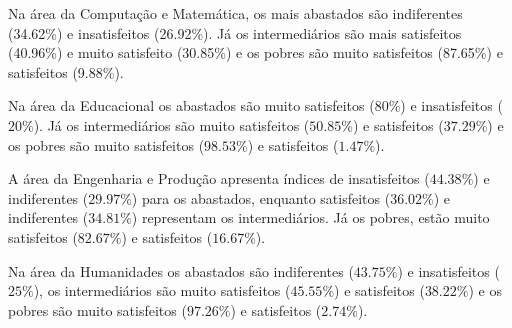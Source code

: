 \documentclass[10pt,a4paper,oneside]{article}
\newcommand{\comp}{Computação e Matemática\xspace}
\newcommand{\edu}{Educacional\xspace}
\newcommand{\eng}{Engenharia e Produção\xspace}
\newcommand{\hum}{Humanidades\xspace}
\begin{document}

Na área da \comp, os mais abastados são indiferentes (34.62\%) e insatisfeitos (26.92\%). Já os intermediários são mais satisfeitos (40.96\%) e muito satisfeito (30.85\%) e 
os pobres são muito satisfeitos (87.65\%) e satisfeitos (9.88\%).

Na área da \edu os abastados são muito satisfeitos ($80\%$) e insatisfeitos ($20\%$). Já os intermediários são muito satisfeitos ($50.85\%$) e satisfeitos ($37.29\%$) e os pobres são muito 
satisfeitos ($98.53\%$) e satisfeitos ($1.47\%$).

A área da \eng apresenta índices de insatisfeitos ($44.38\%$) e indiferentes ($29.97\%$) para os abastados, enquanto satisfeitos ($36.02\%$) e indiferentes ($34.81\%$) representam os intermediários.
Já os pobres, estão muito satisfeitos ($82.67\%$) e satisfeitos ($16.67\%$).

Na área da \hum os abastados são indiferentes ($43.75\%$) e insatisfeitos ($25\%$), os intermediários são muito satisfeitos ($45.55\%$) e satisfeitos ($38.22\%$) e os pobres são muito 
satisfeitos ($97.26\%$) e satisfeitos ($2.74\%$).
\end{document}
